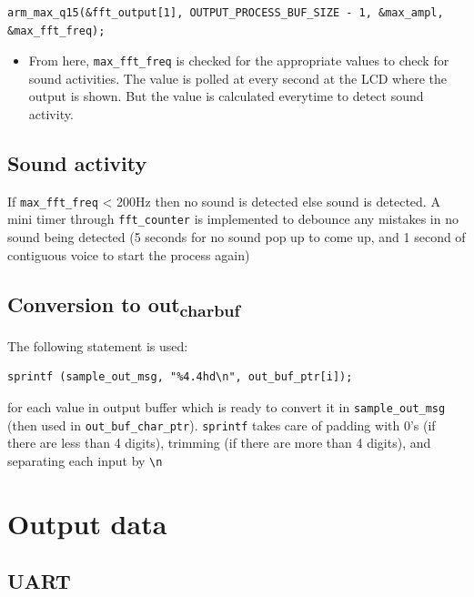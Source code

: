 \documentclass[11pt]{article}
\begin{document}
\begin{verbatim}
arm_max_q15(&fft_output[1], OUTPUT_PROCESS_BUF_SIZE - 1, &max_ampl, &max_fft_freq);
\end{verbatim}

\begin{itemize}
\item From here, \texttt{max\_fft\_freq} is checked for the appropriate values to check for sound activities. The value is polled at every second at the LCD where the output is shown. But the value is calculated everytime to detect sound activity.
\end{itemize}

\subsection{Sound activity}
\label{sec:orgabbf73a}

If \texttt{max\_fft\_freq} < 200Hz then no sound is detected else sound is detected. A mini timer through \texttt{fft\_counter} is implemented to debounce any mistakes in no sound being detected (5 seconds for no sound pop up to come up, and 1 second of contiguous voice to start the process again)

\subsection{Conversion to out\textsubscript{char}\textsubscript{buf}}
\label{sec:orgfb7020a}

The following statement is used:
\begin{verbatim}
sprintf (sample_out_msg, "%4.4hd\n", out_buf_ptr[i]);
\end{verbatim}

for each value in output buffer which is ready to convert it in \texttt{sample\_out\_msg} (then used in \texttt{out\_buf\_char\_ptr}). \texttt{sprintf} takes care of padding with 0's (if there are less than 4 digits), trimming (if there are more than 4 digits), and separating each input by \texttt{\textbackslash{}n}


\section{Output data}
\label{sec:orgba2a735}

\subsection{UART}
\label{sec:orgfae9878}
\end{document}
